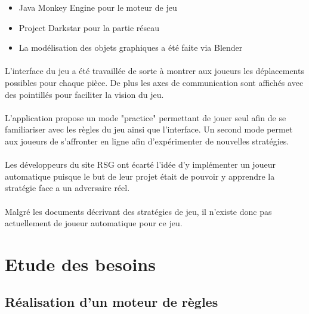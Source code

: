 \documentclass[12pt]{article}
\begin{document}
		\begin{itemize}
			\item Java Monkey Engine pour le moteur de jeu
			\item Project Darkstar pour la partie réseau
			\item La modélisation des objets graphiques a été faite via Blender
		\end{itemize}

		\paragraph{}
		L'interface du jeu a été travaillée de sorte à montrer aux joueurs les déplacements possibles pour chaque pièce. De plus les axes de 
		communication sont affichés avec des pointillés pour faciliter la vision du jeu.
		
		\paragraph{}
		L'application propose un mode "practice" permettant de jouer seul afin de se familiariser avec les règles du jeu ainsi que l'interface.
		Un second mode permet aux joueurs de s'affronter en ligne afin d'expérimenter de nouvelles stratégies.
		
		\paragraph{}
		Les développeurs du site RSG ont écarté l'idée d'y implémenter un joueur automatique puisque le but de leur projet était de 
		pouvoir y apprendre la stratégie face a un adversaire réel.
		
		\paragraph{}
		Malgré les documents décrivant des stratégies de jeu, il n'existe donc pas actuellement de joueur automatique pour ce jeu.
		
		\clearpage

	\section{Etude des besoins}    

		\subsection{Réalisation d'un moteur de règles}
\end{document}
